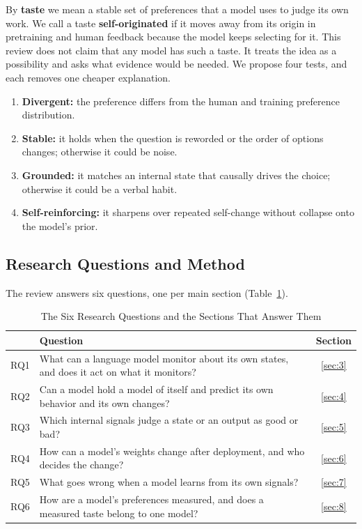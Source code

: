 \documentclass[journal]{IEEEtran}
\begin{document}
By \textbf{taste} we mean a stable set of preferences that a model uses to judge its own work. We call a taste \textbf{self-originated} if it moves away from its origin in pretraining and human feedback because the model keeps selecting for it. This review does not claim that any model has such a taste. It treats the idea as a possibility and asks what evidence would be needed. We propose four tests, and each removes one cheaper explanation.
\begin{enumerate}
\item \textbf{Divergent:} the preference differs from the human and training preference distribution.
\item \textbf{Stable:} it holds when the question is reworded or the order of options changes; otherwise it could be noise.
\item \textbf{Grounded:} it matches an internal state that causally drives the choice; otherwise it could be a verbal habit.
\item \textbf{Self-reinforcing:} it sharpens over repeated self-change without collapse onto the model's prior.
\end{enumerate}

\subsection{Research Questions and Method}\label{sec:1.3}

The review answers six questions, one per main section (Table~\ref{tab:1}).

\begin{table}[!t]
\caption{The Six Research Questions and the Sections That Answer Them}\label{tab:1}
\centering\footnotesize\renewcommand{\arraystretch}{1.15}
\begin{tabularx}{\columnwidth}{@{}l>{\raggedright\arraybackslash}Xc@{}}
\toprule
 & \textbf{Question} & \textbf{Section} \\
\midrule
RQ1 & What can a language model monitor about its own states, and does it act on what it monitors? & \ref{sec:3} \\
RQ2 & Can a model hold a model of itself and predict its own behavior and its own changes? & \ref{sec:4} \\
RQ3 & Which internal signals judge a state or an output as good or bad? & \ref{sec:5} \\
RQ4 & How can a model's weights change after deployment, and who decides the change? & \ref{sec:6} \\
RQ5 & What goes wrong when a model learns from its own signals? & \ref{sec:7} \\
RQ6 & How are a model's preferences measured, and does a measured taste belong to one model? & \ref{sec:8} \\
\bottomrule
\end{tabularx}
\end{table}
\end{document}
